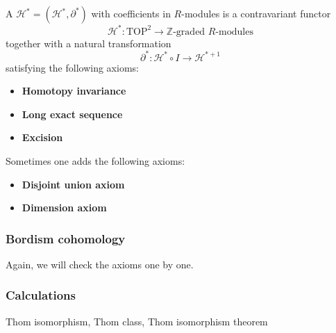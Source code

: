 \documentclass[a4paper,11pt]{article}
\begin{document}
\begin{definition}
    A  \(\mathcal{H}^\ast=(\mathcal{H}^\ast,\partial^\ast)\) with coefficients in \(R\)-modules is a contravariant functor \[\mathcal{H}^\ast:\mathrm{TOP}^2\to\mathbb{Z}\text{-graded }R\text{-modules}\] together with a natural transformation \[\partial^\ast:\mathcal{H}^\ast\circ I\to\mathcal{H}^{\ast+1}\] satisfying the following axioms:
    \begin{itemize}
        \item \textbf{Homotopy invariance}
        \item \textbf{Long exact sequence}
        \item \textbf{Excision}
    \end{itemize}
    Sometimes one adds the following axioms:
    \begin{itemize}
        \item \textbf{Disjoint union axiom}
        \item \textbf{Dimension axiom}
    \end{itemize}
\end{definition}

\subsubsection{Bordism cohomology}
Again, we will check the axioms one by one.

\subsubsection{Calculations}

Thom isomorphism, Thom class, Thom isomorphism theorem


\newpage\printbibliography%
\end{document}
